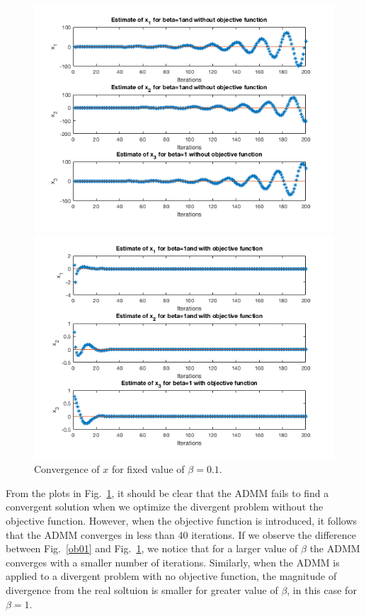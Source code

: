 \documentclass[answers]{exam}
\begin{document}
\begin{itemize}
\begin{framed}
\begin{figure}[H]
    \centering
    \caption{Convergence of $x$ for fixed value of $\beta=0.1$.}
    \begin{minipage}{.5\textwidth}
        \centering
        \includegraphics[width=1.1\textwidth, height=0.4\textheight]{Problem7_3.png}
    \end{minipage}%
    \begin{minipage}{0.5\textwidth}
        \centering
        \includegraphics[width=1.1\textwidth, height=0.4\textheight]{Problem7_4.png}
    \end{minipage}
    \label{ob1}
\end{figure}
From the plots in Fig.~\ref{ob1}, it should be clear that the ADMM fails to find a convergent solution when we optimize the divergent problem without the objective function. However, when the objective function is introduced, it follows that the ADMM converges in less than 40 iterations. If we observe the difference between Fig.~\ref{ob01} and Fig.~\ref{ob1}, we notice that for a larger value of $\beta$ the ADMM converges with a smaller number of iterations. Similarly, when the ADMM is applied to a divergent problem with no objective function, the magnitude of divergence from the real soltuion is smaller for greater value of $\beta$, in this case for $\beta=1$.

\end{framed}
\end{itemize}
\end{document}
